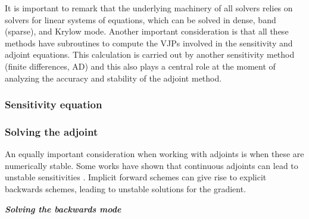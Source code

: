 It is important to remark that the underlying machinery of all solvers relies on solvers for linear systems of equations, which can be solved in dense, band (sparse), and Krylow mode. 
Another important consideration is that all these methods have subroutines to compute the VJPs involved in the sensitivity and adjoint equations. 
This calculation is carried out by another sensitivity method (finite differences, AD) and this also plays a central role at the moment of analyzing the accuracy and stability of the adjoint method. 

\subsubsection{Sensitivity equation}

\subsubsection{Solving the adjoint}


An equally important consideration when working with adjoints is when these are numerically stable. 
Some works have shown that continuous adjoints can lead to unstable sensitivities \cite{Jensen_Nakshatrala_Tortorelli_2014}.
Implicit forward schemes can give rise to explicit backwards schemes, leading to unstable solutions for the gradient. 

\vspace*{10px}
\noindent \textbf{\textit{Solving the backwards mode}}
\vspace*{5px}

